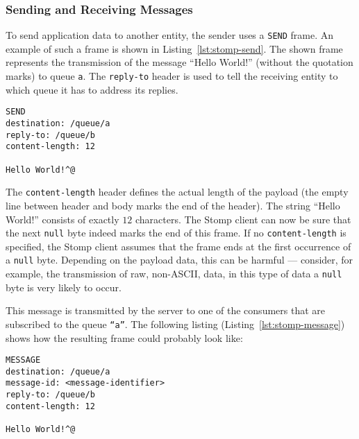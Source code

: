 \subsubsection{Sending and Receiving Messages}

To  send   application  data  to   another  entity,  the  sender   uses  a
\texttt{SEND}  frame.    An  example   of  such  a   frame  is   shown  in
Listing~\ref{lst:stomp-send}. The shown  frame represents the transmission
of the  message ``Hello  World!'' (without the  quotation marks)  to queue
\texttt{a}.  The  \texttt{reply-to} header is  used to tell  the receiving
entity to which queue it has to address its replies.

\medskip
\begin{center}
  \begin{minipage}{.75\textwidth}
    \begin{lstlisting}[captionpos=b,backgroundcolor=\color{listingcolor},frame=lines,numbers=none,stepnumber=5,numberfirstline=false,numberstyle=\tiny,caption={The
        \texttt{SEND} frame is used to send application data.},label={lst:stomp-send}]
SEND
destination: /queue/a
reply-to: /queue/b
content-length: 12

Hello World!^@
    \end{lstlisting}
  \end{minipage}
\end{center}

The  \texttt{content-length}  header  defines  the actual  length  of  the
payload  (the empty  line between  header and  body marks  the end  of the
header).   The   string  ``Hello   World!''   consists  of   exactly  $12$
characters.  The Stomp client can  now be sure that the next \texttt{null}
byte indeed marks the end of this frame.  If no \texttt{content-length} is
specified,  the Stomp  client assumes  that the  frame ends  at  the first
occurrence of a  \texttt{null} byte.  Depending on the  payload data, this
can be  harmful ---  consider, for example,  the transmission of  raw, \ie
non-ASCII, data, in this type of  data a \texttt{null} byte is very likely
to occur.

This message is transmitted by the server to one of the consumers that are
subscribed   to   the  queue   \texttt{``a''}.    The  following   listing
(Listing~\ref{lst:stomp-message})  shows  how  the resulting  frame  could
probably look like:

\medskip
\begin{center}
  \begin{minipage}{.75\textwidth}
    \begin{lstlisting}[captionpos=b,backgroundcolor=\color{listingcolor},frame=lines,numbers=none,stepnumber=5,numberfirstline=false,numberstyle=\tiny,caption={The
        \texttt{MESSAGE} frame is used by the server to transmit a message
        to a client.},label={lst:stomp-message}]
MESSAGE
destination: /queue/a
message-id: <message-identifier>
reply-to: /queue/b
content-length: 12

Hello World!^@
    \end{lstlisting}
  \end{minipage}
\end{center}

